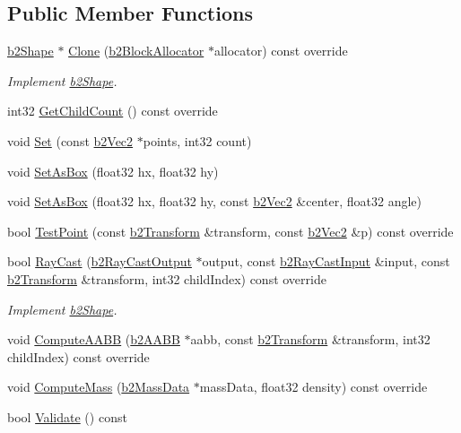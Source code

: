 \subsection*{Public Member Functions}
\begin{DoxyCompactItemize}
\item 
\mbox{\label{classb2_polygon_shape_ae2c2343be33db465f7e83db2061fdd51}} 
\hyperlink{classb2_shape}{b2\+Shape} $\ast$ \hyperlink{classb2_polygon_shape_ae2c2343be33db465f7e83db2061fdd51}{Clone} (\hyperlink{classb2_block_allocator}{b2\+Block\+Allocator} $\ast$allocator) const override
\begin{DoxyCompactList}\small\item\em Implement \hyperlink{classb2_shape}{b2\+Shape}. \end{DoxyCompactList}\item 
int32 \hyperlink{classb2_polygon_shape_aa8bb0d5a88624104425cdee0b2f4427a}{Get\+Child\+Count} () const override
\item 
void \hyperlink{classb2_polygon_shape_a4d7b35550509f570814b97325a68966b}{Set} (const \hyperlink{structb2_vec2}{b2\+Vec2} $\ast$points, int32 count)
\item 
void \hyperlink{classb2_polygon_shape_a6bb90df8b4a40d1c53b64cc352a855dd}{Set\+As\+Box} (float32 hx, float32 hy)
\item 
void \hyperlink{classb2_polygon_shape_a890690250115483da6c7d69829be087e}{Set\+As\+Box} (float32 hx, float32 hy, const \hyperlink{structb2_vec2}{b2\+Vec2} \&center, float32 angle)
\item 
bool \hyperlink{classb2_polygon_shape_a129c4ac76727fe02724f675e3fef7fe5}{Test\+Point} (const \hyperlink{structb2_transform}{b2\+Transform} \&transform, const \hyperlink{structb2_vec2}{b2\+Vec2} \&p) const override
\item 
\mbox{\label{classb2_polygon_shape_a41f20072763688f1745f12f67f40e904}} 
bool \hyperlink{classb2_polygon_shape_a41f20072763688f1745f12f67f40e904}{Ray\+Cast} (\hyperlink{structb2_ray_cast_output}{b2\+Ray\+Cast\+Output} $\ast$output, const \hyperlink{structb2_ray_cast_input}{b2\+Ray\+Cast\+Input} \&input, const \hyperlink{structb2_transform}{b2\+Transform} \&transform, int32 child\+Index) const override
\begin{DoxyCompactList}\small\item\em Implement \hyperlink{classb2_shape}{b2\+Shape}. \end{DoxyCompactList}\item 
void \hyperlink{classb2_polygon_shape_ae9bcc185caf4a030003cefc4576e4717}{Compute\+A\+A\+BB} (\hyperlink{structb2_a_a_b_b}{b2\+A\+A\+BB} $\ast$aabb, const \hyperlink{structb2_transform}{b2\+Transform} \&transform, int32 child\+Index) const override
\item 
void \hyperlink{classb2_polygon_shape_a908db2a51fc79fd49d6fe06be2cd8474}{Compute\+Mass} (\hyperlink{structb2_mass_data}{b2\+Mass\+Data} $\ast$mass\+Data, float32 density) const override
\item 
bool \hyperlink{classb2_polygon_shape_a135f4c20e17f10479e08f7befbd4d1f0}{Validate} () const
\end{DoxyCompactItemize}
